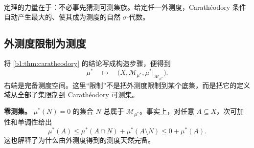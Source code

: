 定理的力量在于：不必事先猜测可测集族。给定任一外测度，Carathéodory 条件自动产生最大的、使其成为测度的自然 \(\sigma\)-代数。

\subsection{外测度限制为测度}
\label{b1:subsec:020304}

将 \cref{b1:thm:caratheodory} 的结论写成构造步骤，便得到
\[
\mu^*
\quad\longmapsto\quad
\bigl(X,\mathcal M_{\mu^*},\mu^*|_{\mathcal M_{\mu^*}}\bigr).
\]
右端是完备测度空间。这里“限制”不是把外测度限制到某个底集，而是把它的定义域从全部子集限制到 Carathéodory 可测集。

\begin{remark}
\label{b1:rem:outer-measure-null}
\textbf{零测集。} \(\mu^*(N)=0\) 的集合 \(N\) 总属于 \(\mathcal M_{\mu^*}\)。事实上，对任意 \(A\subseteq X\)，次可加性和单调性给出
\[
\mu^*(A)\leq\mu^*(A\cap N)+\mu^*(A\setminus N)
\leq0+\mu^*(A).
\]
这也解释了为什么由外测度得到的测度天然完备。
\end{remark}
